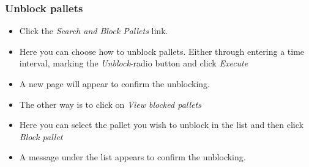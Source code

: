 \documentclass[a4paper]{article}
\begin{document}
\subsubsection{Unblock pallets}
\begin{itemize}
	\item Click the \emph{Search and Block Pallets} link.
	\item Here you can choose how to unblock pallets. Either through entering a time interval, marking the \emph{Unblock}-radio button and click \emph{Execute} 
	\item A new page will appear to confirm the unblocking.
	\item The other way is to click on \emph{View blocked pallets}
	\item Here you can select the pallet you wish to unblock in the list and then click \emph{Block pallet}
	\item A message under the list appears to confirm the unblocking.
\end{itemize}
\end{document}
